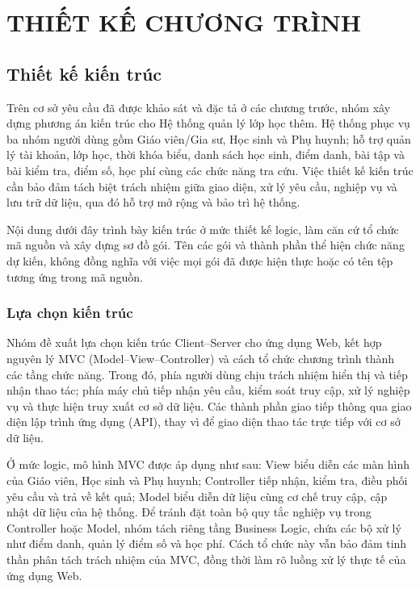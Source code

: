 \chapter{THIẾT KẾ CHƯƠNG TRÌNH}
\section{Thiết kế kiến trúc}

Trên cơ sở yêu cầu đã được khảo sát và đặc tả ở các chương trước, nhóm xây dựng phương án kiến trúc cho Hệ thống quản lý lớp học thêm. Hệ thống phục vụ ba nhóm người dùng gồm Giáo viên/Gia sư, Học sinh và Phụ huynh; hỗ trợ quản lý tài khoản, lớp học, thời khóa biểu, danh sách học sinh, điểm danh, bài tập và bài kiểm tra, điểm số, học phí cùng các chức năng tra cứu. Việc thiết kế kiến trúc cần bảo đảm tách biệt trách nhiệm giữa giao diện, xử lý yêu cầu, nghiệp vụ và lưu trữ dữ liệu, qua đó hỗ trợ mở rộng và bảo trì hệ thống.\par

Nội dung dưới đây trình bày kiến trúc ở mức thiết kế logic, làm căn cứ tổ chức mã nguồn và xây dựng sơ đồ gói. Tên các gói và thành phần thể hiện chức năng dự kiến, không đồng nghĩa với việc mọi gói đã được hiện thực hoặc có tên tệp tương ứng trong mã nguồn.\par

\subsection{Lựa chọn kiến trúc}

Nhóm đề xuất lựa chọn kiến trúc Client–Server cho ứng dụng Web, kết hợp nguyên lý MVC (Model–View–Controller) và cách tổ chức chương trình thành các tầng chức năng. Trong đó, phía người dùng chịu trách nhiệm hiển thị và tiếp nhận thao tác; phía máy chủ tiếp nhận yêu cầu, kiểm soát truy cập, xử lý nghiệp vụ và thực hiện truy xuất cơ sở dữ liệu. Các thành phần giao tiếp thông qua giao diện lập trình ứng dụng (API), thay vì để giao diện thao tác trực tiếp với cơ sở dữ liệu.\par

Ở mức logic, mô hình MVC được áp dụng như sau: View biểu diễn các màn hình của Giáo viên, Học sinh và Phụ huynh; Controller tiếp nhận, kiểm tra, điều phối yêu cầu và trả về kết quả; Model biểu diễn dữ liệu cùng cơ chế truy cập, cập nhật dữ liệu của hệ thống. Để tránh đặt toàn bộ quy tắc nghiệp vụ trong Controller hoặc Model, nhóm tách riêng tầng Business Logic, chứa các bộ xử lý như điểm danh, quản lý điểm số và học phí. Cách tổ chức này vẫn bảo đảm tinh thần phân tách trách nhiệm của MVC, đồng thời làm rõ luồng xử lý thực tế của ứng dụng Web.\par

